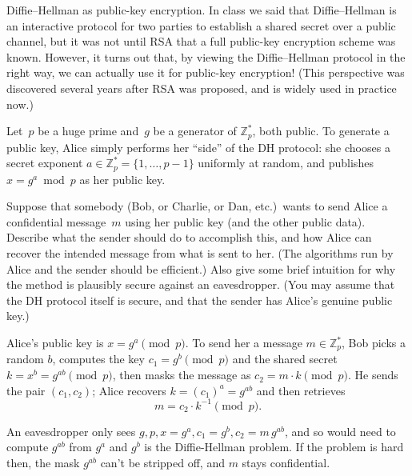 \documentclass[12pt, letterpaper]{article}
\newcommand{\Z}{\mathbb{Z}}
\begin{document}
\begin{problem}{Diffie--Hellman as public-key encryption.}
    In class we said that Diffie--Hellman is an interactive protocol for two parties to establish a shared secret over a public channel, but it was not until RSA that a full public-key encryption scheme was known.
  However, it turns out that, by viewing the Diffie--Hellman protocol in the right way, we can actually use it for public-key encryption!
  (This perspective was discovered several years after RSA was proposed, and is widely used in practice now.)

  Let~$p$ be a huge prime and~$g$ be a generator of $\Z_p^*$, both public.
  To generate a public key, Alice simply performs her ``side'' of the DH protocol: she chooses a secret exponent $a \in \Z_p^* = \{1, \ldots, p-1\}$ uniformly at random, and publishes $x = g^a \bmod p$ as her public key.
\end{problem}
\begin{subproblem}{}
    Suppose that somebody (Bob, or Charlie, or Dan, etc.)\ wants to send Alice a confidential message~$m$ using her public key (and the other public data).
    Describe what the sender should do to accomplish this, and how Alice can recover the intended message from what is sent to her.
    (The algorithms run by Alice and the sender should be efficient.)
    Also give some brief intuition for why the method is plausibly secure against an eavesdropper.
    (You may assume that the DH protocol itself is secure, and that the sender has Alice's genuine public key.)
\end{subproblem}
\begin{problemproof}
    Alice's public key is \(x=g^a\pmod p\). To send her a message \(m\in\Z_p^*\), Bob picks a random \(b\), computes the key \(c_1=g^b\pmod p\) and the shared secret \(k=x^b=g^{ab}\pmod p\), then masks the message as \(c_2=m\cdot k\pmod p\). He sends the pair \((c_1,c_2)\); Alice recovers \(k=(c_1)^a=g^{ab}\) and then retrieves  
\[
m = c_2 \cdot k^{-1}\pmod p.
\]

An eavesdropper only sees \(g,p,x=g^a,c_1=g^b,c_2=m\,g^{ab}\), and so would need to compute \(g^{ab}\) from \(g^a\) and \(g^b\) is the Diffie-Hellman problem.  If the problem is hard then, the mask \(g^{ab}\) can't be stripped off, and \(m\) stays confidential.
\end{problemproof}
\end{document}
